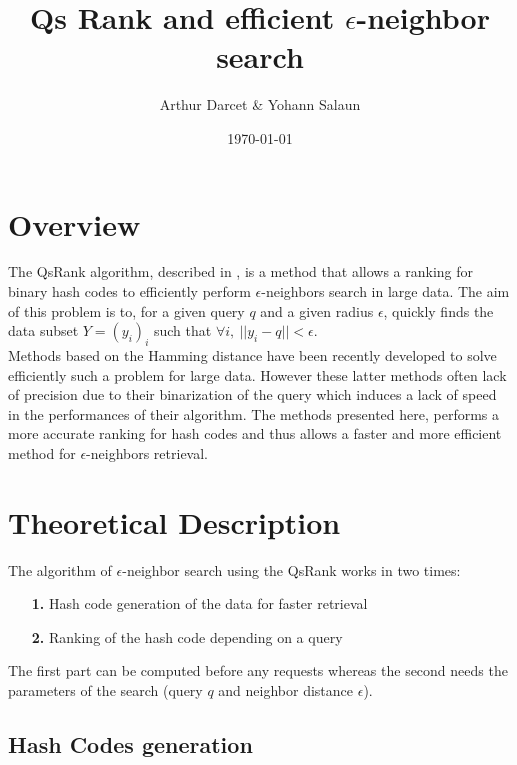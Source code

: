 \documentclass{article}
\title{Qs Rank and efficient $\epsilon$-neighbor search}
\author{Arthur Darcet \& Yohann Salaun}
\date{\today}
\begin{document}
\maketitle

\section{Overview}

The QsRank algorithm, described in \citep{QSRank}, is a method that allows a ranking for binary hash codes to efficiently perform $\epsilon$-neighbors search in large data. The aim of this problem is to, for a given query $q$ and a given radius $\epsilon$, quickly finds the data subset $Y = (y_i)_i$ such that $\forall i,\  ||y_i-q|| < \epsilon$.\\
Methods based on the Hamming distance have been recently developed to solve efficiently such a problem for large data. However these latter methods often lack of precision due to their binarization of the query which induces a lack of speed in the performances of their algorithm. The methods presented here, performs a more accurate ranking for hash codes and thus allows a faster and more efficient method for $\epsilon$-neighbors retrieval.

\section{Theoretical Description}

The algorithm of $\epsilon$-neighbor search using the QsRank works in two times:
\begin{itemize}
	\item[\textbf{1.}] Hash code generation of the data for faster retrieval
	\item[\textbf{2.}] Ranking of the hash code depending on a query
\end{itemize}
The first part can be computed before any requests whereas the second needs the parameters of the search (query $q$ and neighbor distance $\epsilon$).

\subsection{Hash Codes generation}
\end{document}

